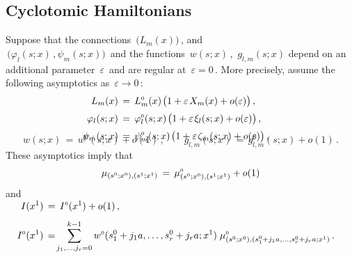 \documentclass[12pt]{amsart}
\def\>{\relax\ifmmode\mskip.666667\thinmuskip\relax\else\kern.111111em\fi}
\def\vsk#1>{\vskip#1\baselineskip}
\def\vvn#1>{\vadjust{\nobreak\vsk#1>\nobreak}\ignorespaces}
\let\sssize\scriptscriptstyle \def\tfrac{\textstyle\frac}
\theoremstyle{definition} %
\numberwithin{equation}{section}
\theoremstyle{definition}
\let\eps\varepsilon
\let\phi\varphi
\def\0{{\sssize0}}
\def\be{\begin{equation*}}
\def\ee{\end{equation*}}
\begin{document}
\subsection{Cyclotomic Hamiltonians}
\label{sec cycl}
Suppose that the connections \,$\bigl(L_m(x)\bigr)$\,,  and
\\
\,$\bigl(\phi_l(s;x)\,,\psi_m(s;x)\bigr)$ \,and the functions \,$w(s;x)$\,, \,$g_{l,m}(s;x)$
depend on an additional parameter \,$\eps$ \,and are regular at \,$\eps=0$\,.
More precisely, assume the following asymptotics as \,$\eps\to 0$\,:
\begin{align}
\notag
\\[-16pt]
\label{eps to 0}
L_m(x)\,&{}=\,L_m^\0(x)\>\bigl(1+\eps\>X_m(x)+o(\eps)\bigr)\,,
\\[2pt]
\notag
\phi_l(s;x)\,&{}=\,\phi_l^\0(s;x)\>\bigl(1+\eps\>\xi_l(s;x)+o(\eps)\bigr)\,,
\\[2pt]
\notag
\psi_m(s;x)\,&{}=\,\psi_m^\0(s;x)\>\bigl(1+\eps\>\zeta_m(s;x)+o(\eps)\bigr)\,,
\\[-30pt]
\notag
\end{align}
\be
w(s;x)\,=\,w^\0(s;x)+o(1)\,,\qquad g_{l,m}(s;x)\,=\,g_{l,m}^\0(s;x)+o(1)\,.
\ee
These asymptotics imply that
\be
\mu_{(s^0;x^0),(s^1;x^1)}\,=\,\mu^\0_{(s^0;x^0),(s^1;x^1)}+o(1)
\vvn-.8>
\ee
and
\begin{align}
\notag
\\[-22pt]
\label{ix10}
I(x^1)\,&{}=\,I^\0(x^1)+o(1)\,,
\\[4pt]
\notag
I^\0(x^1)\,&{}=\!\sum_{j_1, \dots, j_r=0}^{k-1}
w^\0(s_1^0+j_1a, \dots, s_r^0+j_ra; x^1)\;
\mu^\0_{(s^0; x^0),(s_1^0 + j_1a,\dots, s_r^0 + j_ra; x^1)}\,.
\end{align}
\end{document}
